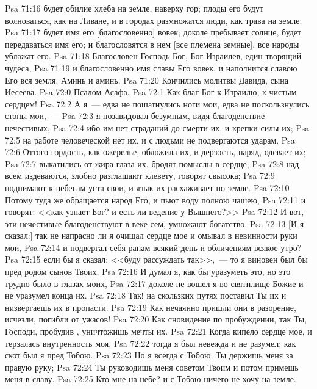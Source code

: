 \vs Psa 71:16 будет обилие хлеба на земле, наверху гор; плоды его будут волноваться, как  на Ливане, и в городах размножатся люди, как трава на земле;
\vs Psa 71:17 будет имя его [благословенно] вовек; доколе пребывает солнце, будет передаваться имя его; и благословятся в нем [все племена земные], все народы ублажат его.
\vs Psa 71:18 Благословен Господь Бог, Бог Израилев, един творящий чудеса,
\vs Psa 71:19 и благословенно имя славы Его вовек, и наполнится славою Его вся земля. Аминь и аминь.
\vs Psa 71:20 Кончились молитвы Давида, сына Иесеева.
\vs Psa 72:0 Псалом Асафа.
\rsbpar\vs Psa 72:1 Как благ Бог к Израилю, к чистым сердцем!
\vs Psa 72:2 А я~--- едва не пошатнулись ноги мои, едва не поскользнулись стопы мои,~---
\vs Psa 72:3 я позавидовал безумным, видя благоденствие нечестивых,
\vs Psa 72:4 ибо им нет страданий до смерти их, и крепки силы их;
\vs Psa 72:5 на работе человеческой нет их, и с  людьми не подвергаются ударам.
\vs Psa 72:6 Оттого гордость, как ожерелье, обложила их, и дерзость,  наряд, одевает их;
\vs Psa 72:7 выкатились от жира глаза их, бродят помыслы в сердце;
\vs Psa 72:8 над всем издеваются, злобно разглашают клевету, говорят свысока;
\vs Psa 72:9 поднимают к небесам уста свои, и язык их расхаживает по земле.
\vs Psa 72:10 Потому туда же обращается народ Его, и пьют воду полною чашею,
\vs Psa 72:11 и говорят: <<как узнает Бог? и есть ли ведение у Вышнего?>>
\vs Psa 72:12 И вот, эти нечестивые благоденствуют в веке сем, умножают богатство.
\vs Psa 72:13 [И я сказал:] так не напрасно ли я очищал сердце мое и омывал в невинности руки мои,
\vs Psa 72:14 и подвергал себя ранам всякий день и обличениям всякое утро?
\vs Psa 72:15  если бы я сказал: <<буду рассуждать так>>,~--- то я виновен был бы пред родом сынов Твоих.
\vs Psa 72:16 И думал я, как бы уразуметь это, но это трудно было в глазах моих,
\vs Psa 72:17 доколе не вошел я во святилище Божие и не уразумел конца их.
\vs Psa 72:18 Так! на скользких путях поставил Ты их и низвергаешь их в пропасти.
\vs Psa 72:19 Как нечаянно пришли они в разорение, исчезли, погибли от ужасов!
\vs Psa 72:20 Как сновидение по пробуждении, так Ты, Господи, пробудив , уничтожишь мечты их.
\vs Psa 72:21 Когда кипело сердце мое, и терзалась внутренность моя,
\vs Psa 72:22 тогда я был невежда и не разумел; как скот был я пред Тобою.
\vs Psa 72:23 Но я всегда с Тобою: Ты держишь меня за правую руку;
\vs Psa 72:24 Ты руководишь меня советом Твоим и потом примешь меня в славу.
\vs Psa 72:25 Кто мне на небе? и с Тобою ничего не хочу на земле.
